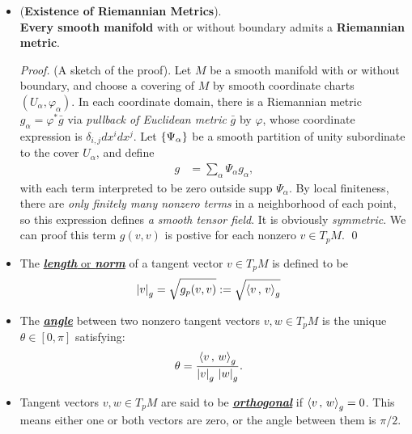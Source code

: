 \documentclass[11pt]{article}
\begin{document}
\begin{itemize}
\item \begin{proposition} (\textbf{Existence of Riemannian Metrics}). \citep{lee2003introduction, lee2018introduction}\ \\
\textbf{Every smooth manifold} with or without boundary admits a \textbf{Riemannian metric}.
\end{proposition}
\begin{proof}
(A sketch of the proof).  Let $M$ be a smooth manifold with or without boundary, and choose a covering of $M$ by smooth coordinate charts $(U_{\alpha}, \varphi_{\alpha})$. In each coordinate domain, there is a Riemannian metric $g_{\alpha}= \varphi^{*}\bar{g}$ via \emph{pullback of Euclidean metric} $\bar{g}$ by $\varphi$, whose coordinate expression is $\delta_{i,j} dx^i dx^j$. Let $\left\{\Psi_{\alpha}\right\}$ be a smooth partition of unity subordinate to the cover ${U_{\alpha}}$, and define
\begin{align*}
g &= \sum_{\alpha}\Psi_{\alpha} g_{\alpha}, 
\end{align*} with each term interpreted to be zero outside $\text{supp }\Psi_{\alpha}$. By local finiteness, there are \emph{only finitely many nonzero terms} in a neighborhood of each point, so this expression defines \emph{a smooth tensor field}. It is obviously \emph{symmetric}. We can proof this term $g(v,v)$ is postive for each nonzero $v  \in T_{p}M$. \qed 
\end{proof}

\item \begin{definition}
The \underline{\emph{\textbf{length}} or \emph{\textbf{norm}}} of a tangent vector $v \in T_{p}M$ is defined to be
\begin{align*}
\left\lvert v \right\rvert_{g} &= \sqrt{g_{p}(v, v)} := \sqrt{\left\langle v\,,\, v \right\rangle_g}
\end{align*}
\end{definition}

\item \begin{definition}
The \underline{\emph{\textbf{angle}}} between two nonzero tangent vectors $v, w \in T_{p}M$ is the unique $\theta \in [0, \pi]$ satisfying:
\begin{align*}
\theta &= \frac{\left\langle v\,,\, w \right\rangle_g}{\left\lvert v \right\rvert_g \, \left\lvert w \right\rvert_g}.
\end{align*}
\end{definition}

\item \begin{definition}
Tangent vectors $v, w \in T_{p}M$ are said to be \underline{\emph{\textbf{orthogonal}}} if $\left\langle v\,,\, w \right\rangle_g = 0$. This means either one or both vectors are zero, or the angle between them is $\pi/2$.
\end{definition}


\end{itemize}
\end{document}
